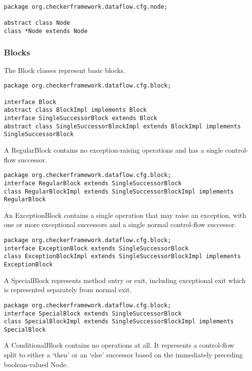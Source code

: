 \begin{verbatim}
package org.checkerframework.dataflow.cfg.node;

abstract class Node
class *Node extends Node
\end{verbatim}


\subsubsection{Blocks}
\label{sec:block_classes}

The Block
classes represent basic blocks.

\begin{verbatim}
package org.checkerframework.dataflow.cfg.block;

interface Block
abstract class BlockImpl implements Block
interface SingleSuccessorBlock extends Block
abstract class SingleSuccessorBlockImpl extends BlockImpl implements SingleSuccessorBlock
\end{verbatim}

A RegularBlock contains no exception-raising operations and has a
single control-flow successor.

\begin{verbatim}
package org.checkerframework.dataflow.cfg.block;
interface RegularBlock extends SingleSuccessorBlock
class RegularBlockImpl extends SingleSuccessorBlockImpl implements RegularBlock
\end{verbatim}

An ExceptionBlock contains a single operation that may raise an
exception, with one or more exceptional successors and a single normal
control-flow successor.

\begin{verbatim}
package org.checkerframework.dataflow.cfg.block;
interface ExceptionBlock extends SingleSuccessorBlock
class ExceptionBlockImpl extends SingleSuccessorBlockImpl implements ExceptionBlock
\end{verbatim}

A SpecialBlock represents method entry or exit, including exceptional
exit which is represented separately from normal exit.

\begin{verbatim}
package org.checkerframework.dataflow.cfg.block;
interface SpecialBlock extends SingleSuccessorBlock
class SpecialBlockImpl extends SingleSuccessorBlockImpl implements SpecialBlock
\end{verbatim}

A ConditionalBlock contains no operations at all.  It represents a
control-flow split to either a `then' or an `else' successor based on
the immediately preceding boolean-valued Node.


